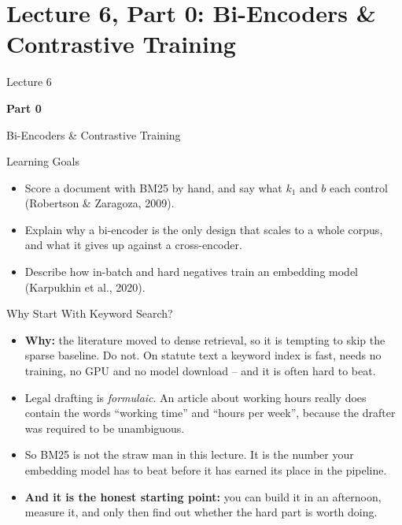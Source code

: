 \section{Lecture 6, Part 0: Bi-Encoders \& Contrastive Training}

\begin{frame}
\vfill
\centering
{\color{RLBlue}\large Lecture 6}

\vspace{0.3em}
{\color{RLBlue}\Large\bfseries Part 0}

\vspace{0.6em}
{\Large Bi-Encoders \& Contrastive Training}
\vfill
\end{frame}

\begin{frame}{Learning Goals}
\begin{itemize}
  \item Score a document with BM25 by hand, and say what $k_1$ and $b$ each control (Robertson \& Zaragoza, 2009).
  \pause
  \item Explain why a bi-encoder is the only design that scales to a whole corpus, and what it gives up against a cross-encoder.
  \pause
  \item Describe how in-batch and hard negatives train an embedding model (Karpukhin et al., 2020).
\end{itemize}
\end{frame}

\begin{frame}{Why Start With Keyword Search?}
\begin{itemize}
  \item \textbf{Why:} the literature moved to dense retrieval, so it is tempting to skip the sparse baseline. Do not. On statute text a keyword index is fast, needs no training, no GPU and no model download -- and it is often hard to beat.
  \pause
  \item Legal drafting is \emph{formulaic}. An article about working hours really does contain the words ``working time'' and ``hours per week'', because the drafter was required to be unambiguous.
  \pause
  \item So BM25 is not the straw man in this lecture. It is the number your embedding model has to beat before it has earned its place in the pipeline.
  \pause
  \item \textbf{And it is the honest starting point:} you can build it in an afternoon, measure it, and only then find out whether the hard part is worth doing.
\end{itemize}
\end{frame}

